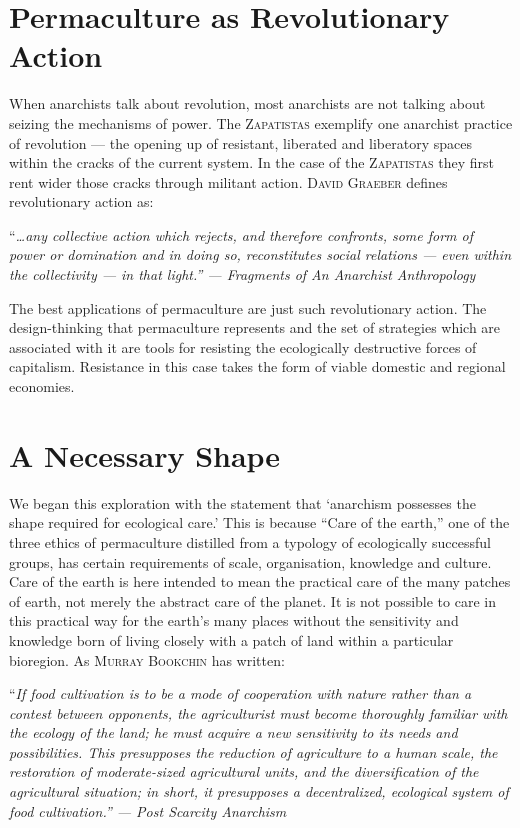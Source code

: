 \documentclass[a4paper, 11pt]{article}
\begin{document}
\begin{multicols*}{2}
\section*{Permaculture as Revolutionary Action}

When anarchists talk about revolution, most anarchists are not talking about seizing the mechanisms of power.  The \textsc{Zapatistas} exemplify one anarchist practice of revolution --- the opening up of resistant, liberated and liberatory spaces within the cracks of the current system.  In the case of the \textsc{Zapatistas} they first rent wider those cracks through militant action.  \textsc{David Graeber} defines revolutionary action as:

\vspace{1mm}
``\em{\ldots any collective action which rejects, and therefore confronts, some form of power or domination and in doing so, reconstitutes social relations --- even within the collectivity --- in that light.}\em'' --- \em{Fragments of An Anarchist Anthropology}\em
\vspace{1mm}

The best applications of permaculture are just such revolutionary action.  The design-thinking that permaculture represents and the set of strategies which are associated with it are tools for resisting the ecologically destructive forces of capitalism.  Resistance in this case takes the form of viable domestic and regional economies.

\section*{A Necessary Shape}

We began this exploration with the statement that `anarchism possesses the shape required for ecological care.' This is because ``Care of the earth,'' one of the three ethics of permaculture distilled from a typology of ecologically successful groups, has certain requirements of scale, organisation, knowledge and culture.  Care of the earth is here intended to mean the practical care of the many patches of earth, not merely the abstract care of the planet.  It is not possible to care in this practical way for the earth's many places without the sensitivity and knowledge born of living closely with a patch of land within a particular bioregion.  As \textsc{Murray Bookchin} has written:

\vspace{1mm}
``\em{If food cultivation is to be a mode of cooperation with nature rather than a contest between opponents, the agriculturist must become thoroughly familiar with the ecology of the land; he must acquire a new sensitivity to its needs and possibilities. This presupposes the reduction of agriculture to a human scale, the restoration of moderate-sized agricultural units, and the diversification of the agricultural situation; in short, it presupposes a decentralized, ecological system of food cultivation.}\em'' --- \em{Post Scarcity Anarchism}\em
\vspace{1mm}


\end{multicols*}
\end{document}
